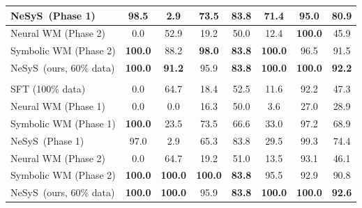 \documentclass{article}
\theoremstyle{plain}
\theoremstyle{definition}
\theoremstyle{remark}
\newcommand{\ours}{{\sc NeSyS}\xspace}
\begin{document}
\begin{table}[ht]
\begin{tabular}{lccccccc}
    \ours\ (Phase 1) & 98.5 & 2.9 & 73.5 & \textbf{83.8} & 71.4 & 95.0 & 80.9\\
    \midrule
    Neural WM (Phase 2) & 0.0 & 52.9 & 19.2 & 50.0 & 12.4 & \textbf{100.0} & 45.9\\
    Symbolic WM (Phase 2) & \textbf{100.0} & 88.2 & \textbf{98.0} & \textbf{83.8} & \textbf{100.0} & 96.5 & 91.5\\
    \ours~(ours, 60\% data) & \textbf{100.0} & \textbf{91.2} & 95.9 & \textbf{83.8} & \textbf{100.0} & \textbf{100.0} & \textbf{92.2} \\
    \midrule
    \rowcolor{gray!15}
    \multicolumn{8}{c}{\bf Qwen3-4B} \\
    \midrule
    SFT (100\% data) & 0.0 & 64.7 & 18.4 & 52.5 & 11.6 & 92.2 & 47.3 \\
    \midrule
    Neural WM (Phase 1) & 0.0 & 0.0 & 16.3 & 50.0 & 3.6 & 27.0 & 28.9 \\
    Symbolic WM (Phase 1) & \textbf{100.0} & 23.5 & 73.5 & 66.6 & 33.0 & 97.2 & 68.9\\
    \ours\ (Phase 1) & 97.0 & 2.9 & 65.3 & 83.8 & 29.5 & 99.3 & 74.4 \\
    \midrule
    Neural WM (Phase 2) & 0.0 & 64.7 & 19.2 & 51.0 & 13.5 & 93.1 & 46.1 \\
    Symbolic WM (Phase 2) & \textbf{100.0} & \textbf{100.0} & \textbf{100.0} & \textbf{83.8} & 95.5 & 92.9 & 90.8 \\
    \ours~(ours, 60\% data) & \textbf{100.0} & \textbf{100.0} & 95.9 & \textbf{83.8} & \textbf{100.0} & \textbf{100.0} & \textbf{92.6} \\
    \bottomrule
  \end{tabular}
\end{table}
\end{document}
